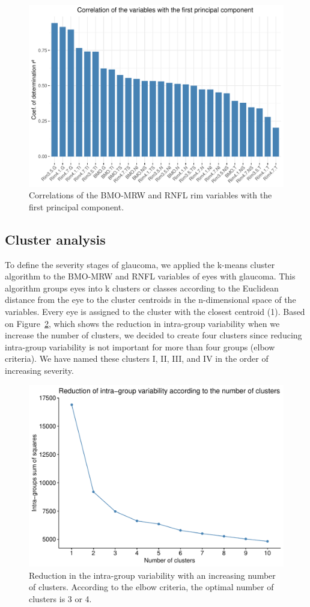 \documentclass[fleqn,10pt]{wlscirep}
\begin{document}
\begin{figure}[ht]
\centering
\includegraphics[width=0.5\linewidth]{img/correlation-pca.pdf}
\caption{Correlations of the BMO-MRW and RNFL rim variables with the first principal component.}
\label{fig:correlation-pca}
\end{figure}

\subsection*{Cluster analysis}

To define the severity stages of glaucoma, we applied the k-means cluster algorithm to the BMO-MRW and RNFL variables of eyes with glaucoma. This algorithm groups eyes into k clusters or classes according to the Euclidean distance from the eye to the cluster centroids in the n-dimensional space of the variables. Every eye is assigned to the cluster with the closest centroid (1). Based on Figure~\ref{fig:reduction-variability-clusters}, which shows the reduction in intra-group variability when we increase the number of clusters, we decided to create four clusters since reducing intra-group variability is not important for more than four groups (elbow criteria)\cite{kassambara:2017:practical}. We have named these clusters I, II, III, and IV in the order of increasing severity.

\begin{figure}[ht]
\centering
\includegraphics[width=0.5\linewidth]{img/reduction-variability-clusters.pdf}
\caption{Reduction in the intra-group variability with an increasing number of clusters. According to the elbow criteria, the optimal number of clusters is 3 or 4.}
\label{fig:reduction-variability-clusters}
\end{figure}
\end{document}
